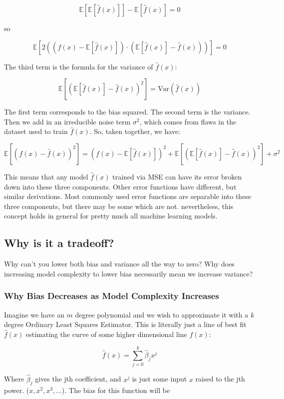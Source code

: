 \documentclass[12pt]{article}
\begin{document}
\[
\mathbb{E}[\mathbb{E}[\hat{f}(x)]] - \mathbb{E}[\hat{f}(x)] = 0
\]

so 

\[
\mathbb{E}\left[2((f(x) - \mathbb{E}[\hat{f}(x)]) \cdot (\mathbb{E}[\hat{f}(x)] - \hat{f}(x)))\right] = 0
\]

The third term is the formula for the variance of \(\hat{f}(x)\):

\[
\mathbb{E}\left[( \mathbb{E}[\hat{f}(x)] - \hat{f}(x))^2\right] = \text{Var}(\hat{f}(x))
\]

The first term corresponds to the bias squared. The second term is the variance. Then we add in an irreducible noise term \(\sigma^2\), which comes from flaws in the dataset used to train \(\hat{f}(x)\). So, taken together, we have:

\[
\mathbb{E}[(f(x) - \hat{f}(x))^2] = (f(x) - \mathbb{E}[\hat{f}(x)])^2 + \mathbb{E}\left[( \mathbb{E}[\hat{f}(x)] - \hat{f}(x))^2\right]  + \sigma^2 
\]

This means that any model \(\hat{f}(x)\) trained via MSE can have its error broken down into these three components. Other error functions have different, but similar derivations. Most commonly used error functions are separable into these three components, but there may be some which are not. nevertheless, this concept holds in general for pretty much all machine learning models.

\subsection{Why is it a tradeoff?}
Why can't you lower both bias and variance all the way to zero? Why does increasing model complexity to lower bias necessarily mean we increase variance? 

\subsubsection{Why Bias Decreases as Model Complexity Increases}

Imagine we have an \(m\) degree polynomial and we wish to approximate it with a \(k\) degree Ordinary Least Squares Estimator. This is literally just a line of best fit \(\hat{f}(x)\) estimating the curve of some higher dimensional line \(f(x)\):

\[\hat{f}(x) = \sum_{j=0}^k \hat{\beta}_jx^j\]

Where \(\hat{\beta}_j\) gives the jth coefficient, and \(x^j\) is just some input \(x\) raised to the jth power. (\(x, x^2, x^3, ...\)). The bias for this function will be 
\end{document}

